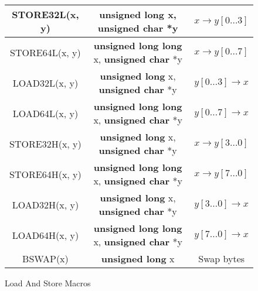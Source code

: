 \documentclass[synpaper]{book}
\begin{document}
        
\newpage
\begin{figure}[hpbt]
\begin{small}
\begin{center}
\begin{tabular}{|c|c|c|}
     \hline STORE32L(x, y) & {\bf unsigned long} x, {\bf unsigned char} *y & $x \to y[0 \ldots 3]$ \\
     \hline STORE64L(x, y) & {\bf unsigned long long} x, {\bf unsigned char} *y & $x \to y[0 \ldots 7]$ \\
     \hline LOAD32L(x, y) & {\bf unsigned long} x, {\bf unsigned char} *y & $y[0 \ldots 3] \to x$ \\
     \hline LOAD64L(x, y) & {\bf unsigned long long} x, {\bf unsigned char} *y & $y[0 \ldots 7] \to x$ \\
     \hline STORE32H(x, y) & {\bf unsigned long} x, {\bf unsigned char} *y & $x \to y[3 \ldots 0]$ \\
     \hline STORE64H(x, y) & {\bf unsigned long long} x, {\bf unsigned char} *y & $x \to y[7 \ldots 0]$ \\
     \hline LOAD32H(x, y) & {\bf unsigned long} x, {\bf unsigned char} *y & $y[3 \ldots 0] \to x$ \\
     \hline LOAD64H(x, y) & {\bf unsigned long long} x, {\bf unsigned char} *y & $y[7 \ldots 0] \to x$ \\
     \hline BSWAP(x) & {\bf unsigned long} x & Swap bytes \\
     \hline
\end{tabular}
\caption{Load And Store Macros}
\end{center}
\end{small}
\end{figure}
\end{document}
